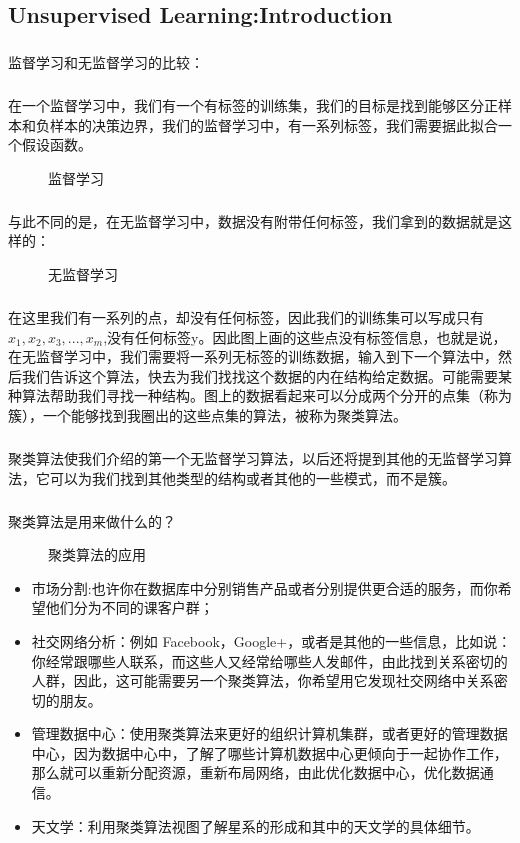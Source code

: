 \documentclass{article}
\begin{document}
\begin{CJK}{UTF8}{gbsn}
\subsection{Unsupervised Learning:Introduction}
\subparagraph{}
监督学习和无监督学习的比较：
\subparagraph{}
在一个监督学习中，我们有一个有标签的训练集，我们的目标是找到能够区分正样本和负样本的决策边界，我们的监督学习中，有一系列标签，我们需要据此拟合一个假设函数。
\begin{figure}[H]
\label{fig:802}
\caption{监督学习}
\end{figure}
\subparagraph{}
与此不同的是，在无监督学习中，数据没有附带任何标签，我们拿到的数据就是这样的：
\begin{figure}[H]
\label{fig:801}
\caption{无监督学习}
\end{figure}
\subparagraph{}
在这里我们有一系列的点，却没有任何标签，因此我们的训练集可以写成只有$x_1,x_2,x_3,...,x_m$,没有任何标签y。因此图上画的这些点没有标签信息，也就是说，在无监督学习中，我们需要将一系列无标签的训练数据，输入到下一个算法中，然后我们告诉这个算法，快去为我们找找这个数据的内在结构给定数据。可能需要某种算法帮助我们寻找一种结构。图上的数据看起来可以分成两个分开的点集（称为簇），一个能够找到我圈出的这些点集的算法，被称为聚类算法。
\subparagraph{}
聚类算法使我们介绍的第一个无监督学习算法，以后还将提到其他的无监督学习算法，它可以为我们找到其他类型的结构或者其他的一些模式，而不是簇。
\subparagraph{}
聚类算法是用来做什么的？
\begin{figure}[H]
\label{fig:803}
\caption{聚类算法的应用}
\end{figure}
\begin{itemize}
\item 市场分割:也许你在数据库中分别销售产品或者分别提供更合适的服务，而你希望他们分为不同的课客户群；
\item 社交网络分析：例如 Facebook，Google+，或者是其他的一些信息，比如说：你经常跟哪些人联系，而这些人又经常给哪些人发邮件，由此找到关系密切的人群，因此，这可能需要另一个聚类算法，你希望用它发现社交网络中关系密切的朋友。
\item 管理数据中心：使用聚类算法来更好的组织计算机集群，或者更好的管理数据中心，因为数据中心中，了解了哪些计算机数据中心更倾向于一起协作工作，那么就可以重新分配资源，重新布局网络，由此优化数据中心，优化数据通信。
\item 天文学：利用聚类算法视图了解星系的形成和其中的天文学的具体细节。
\end{itemize}
\begin{figure}[H]
\label{fig:805}
\end{figure}

\end{CJK}
\end{document}
